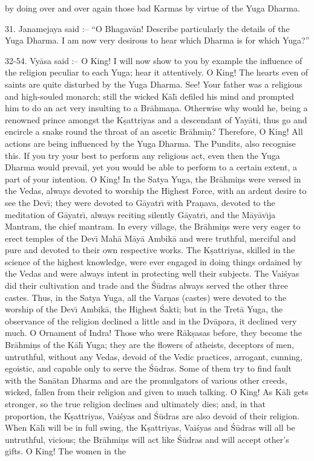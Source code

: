 by doing over and over again those bad Karmas by virtue of the Yuga Dharma.

31. Janamejaya said :-- ``O Bhagav\=an! Describe particularly the details of the Yuga Dharma. I am now very desirous to hear which Dharma is for which Yuga?''

32-54. Vy\=asa said :-- O King! I will now show to you by example the influence of the religion peculiar to each Yuga; hear it attentively. O King! The hearts even of saints are quite disturbed by the Yuga Dharma. See! Your father was a religious and high-souled monarch; still the wicked K\=al\={\i} defiled his mind and prompted him to do an act very insulting to a Br\=ahma\d{n}a. Otherwise why would he, being a renowned prince amongst the K\d{s}attriyas and a descendant of Yay\=ati, thus go and encircle a snake round the throat of an ascetic Br\=ahmi\d{n}? Therefore, O King! All actions are being influenced by the Yuga Dharma. The Pundits, also recognise this. If you try your best to perform any religious act, even then the Yuga Dharma would prevail, yet you would be able to perform to a certain extent, a part of your intention. O King! In the Satya Yuga, the Br\=ahmi\d{n}s were versed in the Vedas, always devoted to worship the Highest Force, with an ardent desire to see the Dev\={\i}; they were devoted to G\=ayatr\={\i} with Pra\d{n}ava, devoted to the meditation of G\=ayatr\={\i}, always reciting silently G\=ayatr\={\i}, and the M\=ay\=av\={\i}ja Mantram, the chief mantram. In every village, the Br\=ahmi\d{n}s were very eager to erect temples of the Dev\={\i} Mah\=a M\=ay\=a Ambik\=a and were truthful, merciful and pure and devoted to their own respective works. The K\d{s}attriyas, skilled in the science of the highest knowledge, were ever engaged in doing things ordained by the Vedas and were always intent in protecting well their subjects. The Vai\'syas did their cultivation and trade and the \'S\=udras always served the other three castes. Thus, in the Satya Yuga, all the Var\d{n}as (castes) were devoted to the worship of the Dev\={\i} Ambik\=a, the Highest \'Sakti; but in the Tret\=a Yuga, the observance of the religion declined a little and in the Dv\=apara, it declined very much. O Ornament of Indra! Those who were R\=ak\d{s}asas before, they become the Br\=ahmi\d{n}s of the K\=al\={\i} Yuga; they are the flowers of atheists, deceptors of men, untruthful, without any Vedas, devoid of the Vedic practices, arrogant, cunning, egoistic, and capable only to serve the \'S\=udras. Some of them try to find fault with the San\=atan Dharma and are the promulgators of various other creeds, wicked, fallen from their religion and given to much talking. O King! As K\=al\={\i} gets stronger, so the true religion declines and ultimately dies; and, in that proportion, the K\d{s}attriyas, Vai\'syas and \'S\=udras are also devoid of their religion. When K\=al\={\i} will be in full swing, the K\d{s}attriyas, Vai\'syas and \'S\=udras will all be untruthful, vicious; the Br\=ahmi\d{n}s will act like \'S\=udras and will accept other's gifts. O King! The women in the

